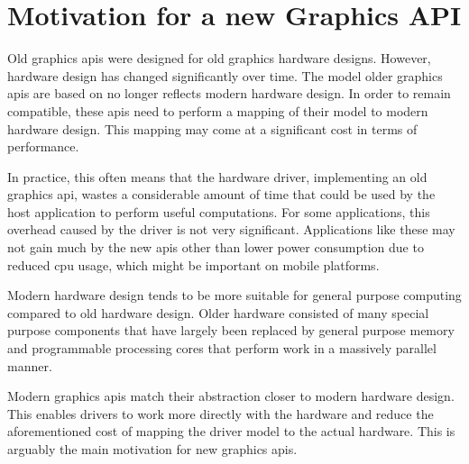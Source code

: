   \section{Motivation for a new Graphics API}
    Old graphics \glspl{api} were designed for old graphics hardware designs.
    However, hardware design has changed significantly over time.
    The model older graphics \glspl{api} are based on no longer reflects modern hardware design.
    In order to remain compatible, these \glspl{api} need to perform a mapping of their model to modern hardware design.
    This mapping may come at a significant cost in terms of performance.

    In practice, this often means that the hardware driver, implementing an old graphics \gls{api}, wastes a considerable amount of time that could be used by the host application to perform useful computations.
    For some applications, this overhead caused by the driver is not very significant.
    Applications like these may not gain much by the new \glspl{api} other than lower power consumption due to reduced \gls{cpu} usage, which might be important on mobile platforms.

    Modern hardware design tends to be more suitable for general purpose computing compared to old hardware design.
    Older hardware consisted of many special purpose components that have largely been replaced by general purpose memory and programmable processing cores that perform work in a massively parallel manner.


    Modern graphics \glspl{api} match their abstraction closer to modern hardware design.
    This enables drivers to work more directly with the hardware and reduce the aforementioned cost of mapping the driver model to the actual hardware.
    This is arguably the main motivation for new graphics \glspl{api}.

